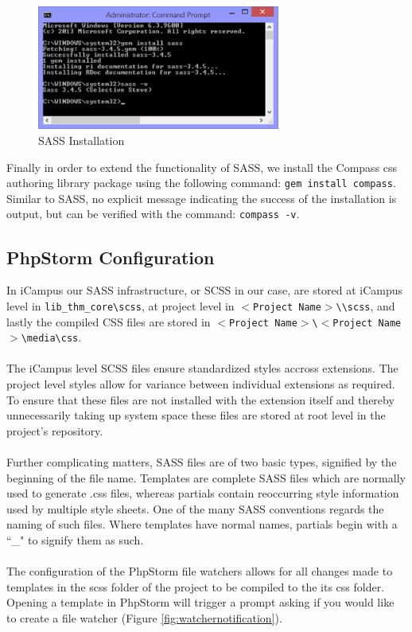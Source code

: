 \documentclass[]{report}
\begin{document}
\begin{figure}[h] 
  \centering
  \includegraphics[width=8cm]{sassinstallation.png}
  \caption{SASS Installation}
  \label{fig:sassinstallation}
\end{figure}

\noindent
Finally in order to extend the functionality of SASS, we install the Compass css authoring library package using the following command: \texttt{gem install compass}. Similar to SASS, no explicit message indicating the success of the installation is output, but can be verified with the command: \texttt{compass -v}.

\subsection{PhpStorm Configuration}

In iCampus our SASS infrastructure, or SCSS in our case, are stored at iCampus level in \texttt{lib\_thm\_core\textbackslash scss}, at project level in \texttt{$<$Project Name$>$\textbackslash \textbackslash scss}, and lastly the compiled CSS files are stored in \texttt{$<$Project Name$>$\textbackslash $<$Project Name$>$\textbackslash media\textbackslash css}.\\
\\
The iCampus level SCSS files ensure standardized styles accross extensions. The project level styles allow for variance between individual extensions as required. To ensure that these files are not installed with the extension itself and thereby unnecessarily taking up system space these files are stored at root level in the project's repository.\\
\\
Further complicating matters, SASS files are of two basic types, signified by the beginning of the file name. Templates are complete SASS files which are normally used to generate .css files, whereas partials contain reoccurring style information used by multiple style sheets. One of the many SASS conventions regards the naming of such files. Where templates have normal names, partials begin with a ``\_" to signify them as such.\\
\\
The configuration of the PhpStorm file watchers allows for all changes made to templates in the scss folder of the project to be compiled to the its css folder. Opening a template in PhpStorm will trigger a prompt asking if you would like to create a file watcher (Figure \ref{fig:watchernotification}).\\
\\
\end{document}
